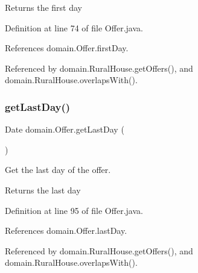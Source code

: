 \begin{DoxyReturn}{Returns}
the first day 
\end{DoxyReturn}


Definition at line 74 of file Offer.\+java.


\begin{DoxyCode}{0}

\end{DoxyCode}


References domain.\+Offer.\+first\+Day.



Referenced by domain.\+Rural\+House.\+get\+Offers(), and domain.\+Rural\+House.\+overlaps\+With().

\mbox{\label{classdomain_1_1Offer_a8bf48365a8fc185dbdcaac80a9d84444}} 
\subsubsection{\texorpdfstring{getLastDay()}{getLastDay()}}
{\footnotesize\ttfamily Date domain.\+Offer.\+get\+Last\+Day (\begin{DoxyParamCaption}{ }\end{DoxyParamCaption})}



Get the last day of the offer. 

\begin{DoxyReturn}{Returns}
the last day 
\end{DoxyReturn}


Definition at line 95 of file Offer.\+java.


\begin{DoxyCode}{0}

\end{DoxyCode}


References domain.\+Offer.\+last\+Day.



Referenced by domain.\+Rural\+House.\+get\+Offers(), and domain.\+Rural\+House.\+overlaps\+With().

